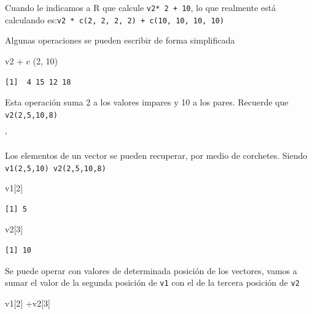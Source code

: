 \documentclass[
  letterpaper,
]{scrbook}
\newenvironment{Shaded}{\begin{snugshade}}{\end{snugshade}}
\newcommand{\DecValTok}[1]{\textcolor[rgb]{0.68,0.00,0.00}{#1}}
\newcommand{\FunctionTok}[1]{\textcolor[rgb]{0.28,0.35,0.67}{#1}}
\newcommand{\NormalTok}[1]{\textcolor[rgb]{0.00,0.23,0.31}{#1}}
\newcommand{\SpecialCharTok}[1]{\textcolor[rgb]{0.37,0.37,0.37}{#1}}
\begin{document}
Cuando le indicamos a R que calcule \texttt{v2*\ 2\ +\ 10}, lo que
realmente está calculando
es:\texttt{v2\ *\ c(2,\ 2,\ 2,\ 2)\ +\ c(10,\ 10,\ 10,\ 10)}

Algunas operaciones se pueden escribir de forma simplificada

\begin{Shaded}
\begin{Highlighting}[]
\NormalTok{v2 }\SpecialCharTok{+} \FunctionTok{c}\NormalTok{ (}\DecValTok{2}\NormalTok{, }\DecValTok{10}\NormalTok{)}
\end{Highlighting}
\end{Shaded}

\begin{verbatim}
[1]  4 15 12 18
\end{verbatim}

Esta operación suma 2 a los valores impares y 10 a los pares. Recuerde
que \texttt{v2(2,5,10,8)}

`

Los elementos de un vector se pueden recuperar, por medio de corchetes.
Siendo \texttt{v1(2,5,10)\ v2(2,5,10,8)}

\begin{Shaded}
\begin{Highlighting}[]
\NormalTok{v1[}\DecValTok{2}\NormalTok{]}
\end{Highlighting}
\end{Shaded}

\begin{verbatim}
[1] 5
\end{verbatim}

\begin{Shaded}
\begin{Highlighting}[]
\NormalTok{v2[}\DecValTok{3}\NormalTok{]}
\end{Highlighting}
\end{Shaded}

\begin{verbatim}
[1] 10
\end{verbatim}

Se puede operar con valores de determinada posición de los vectores,
vamos a sumar el valor de la segunda posición de \texttt{v1} con el de
la tercera posición de \texttt{v2}

\begin{Shaded}
\begin{Highlighting}[]
\NormalTok{v1[}\DecValTok{2}\NormalTok{] }\SpecialCharTok{+}\NormalTok{v2[}\DecValTok{3}\NormalTok{]}
\end{Highlighting}
\end{Shaded}
\end{document}
